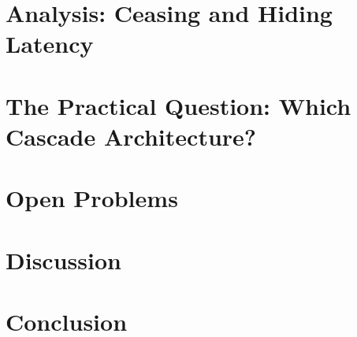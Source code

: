 \documentclass[11pt,a4paper]{article}
\theoremstyle{definition}
\begin{document}
\section{Analysis: Ceasing and Hiding Latency}
\label{sec:analysis}


\section{The Practical Question: Which Cascade Architecture?}
\label{sec:practical}


\section{Open Problems}
\label{sec:open_problems}


\section{Discussion}
\label{sec:discussion}


\section{Conclusion}
\label{sec:conclusion}




\end{document}
